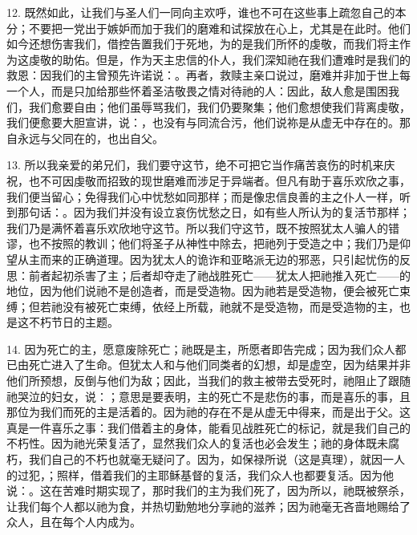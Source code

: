 12. 既然如此，让我们与圣人们一同向主欢呼，谁也不可在这些事上疏忽自己的本分；不要把一党出于嫉妒而加于我们的磨难和试探放在心上，尤其是在此时。他们如今还想伤害我们，借控告置我们于死地，为的是我们所怀的虔敬，而我们将主作为这虔敬的助佑。但是，作为天主忠信的仆人，我们深知祂在我们遭难时是我们的救恩：因我们的主曾预先许诺说：。再者，救赎主亲口说过，磨难并非加于世上每一个人，而是只加给那些怀着圣洁敬畏之情对待祂的人：因此，敌人愈是围困我们，我们愈要自由；他们虽辱骂我们，我们仍要聚集；他们愈想使我们背离虔敬，我们便愈要大胆宣讲，说：，也没有与同流合污，他们说祢是从虚无中存在的。那自永远与父同在的，也出自父。\par

13. 所以我亲爱的弟兄们，我们要守这节，绝不可把它当作痛苦哀伤的时机来庆祝，也不可因虔敬而招致的现世磨难而涉足于异端者。但凡有助于喜乐欢欣之事，我们便当留心；免得我们心中忧愁如同那样；而是像忠信良善的主之仆人一样，听到那句话：。因为我们并没有设立哀伤忧愁之日，如有些人所认为的复活节那样；我们乃是满怀着喜乐欢欣地守这节。所以我们守这节，既不按照犹太人骗人的错谬，也不按照的教训；他们将圣子从神性中除去，把祂列于受造之中；我们乃是仰望从主而来的正确道理。因为犹太人的诡诈和亚略派无边的邪恶，只引起忧伤的反思：前者起初杀害了主；后者却夺走了祂战胜死亡——犹太人把祂推入死亡——的地位，因为他们说祂不是创造者，而是受造物。因为祂若是受造物，便会被死亡束缚；但若祂没有被死亡束缚，依经上所载，祂就不是受造物，而是受造物的主，也是这不朽节日的主题。\par

14. 因为死亡的主，愿意废除死亡；祂既是主，所愿者即告完成；因为我们众人都已由死亡进入了生命。但犹太人和与他们同类者的幻想，却是虚空，因为结果并非他们所预想，反倒与他们为敌；因此，当我们的救主被带去受死时，祂阻止了跟随祂哭泣的妇女，说：；意思是要表明，主的死亡不是悲伤的事，而是喜乐的事，且那位为我们而死的主是活着的。因为祂的存在不是从虚无中得来，而是出于父。这真是一件喜乐之事：我们借着主的身体，能看见战胜死亡的标记，就是我们自己的不朽性。因为祂光荣复活了，显然我们众人的复活也必会发生；祂的身体既未腐朽，我们自己的不朽也就毫无疑问了。因为，如保禄所说（这是真理），就因一人的过犯，；照样，借着我们的主耶稣基督的复活，我们众人也都要复活。因为他说：。这在苦难时期实现了，那时我们的主为我们死了，因为所以，祂既被祭杀，让我们每个人都以祂为食，并热切勤勉地分享祂的滋养；因为祂毫无吝啬地赐给了众人，且在每个人内成为。\par

